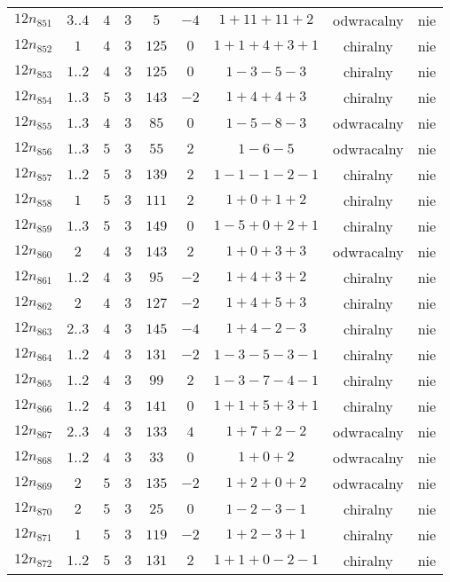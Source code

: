 \begin{longtable}{ccccccccc}
$12n_{851}$ & $3..4$ & $4$ & $3$ & $5$ & $-4$ & $1+11+11+2$ & odwracalny & nie \\
$12n_{852}$ & $1$ & $4$ & $3$ & $125$ & $0$ & $1+1+4+3+1$ & chiralny & nie \\
$12n_{853}$ & $1..2$ & $4$ & $3$ & $125$ & $0$ & $1-3-5-3$ & chiralny & nie \\
$12n_{854}$ & $1..3$ & $5$ & $3$ & $143$ & $-2$ & $1+4+4+3$ & chiralny & nie \\
$12n_{855}$ & $1..3$ & $4$ & $3$ & $85$ & $0$ & $1-5-8-3$ & odwracalny & nie \\
$12n_{856}$ & $1..3$ & $5$ & $3$ & $55$ & $2$ & $1-6-5$ & odwracalny & nie \\
$12n_{857}$ & $1..2$ & $5$ & $3$ & $139$ & $2$ & $1-1-1-2-1$ & chiralny & nie \\
$12n_{858}$ & $1$ & $5$ & $3$ & $111$ & $2$ & $1+0+1+2$ & chiralny & nie \\
$12n_{859}$ & $1..3$ & $5$ & $3$ & $149$ & $0$ & $1-5+0+2+1$ & chiralny & nie \\
$12n_{860}$ & $2$ & $4$ & $3$ & $143$ & $2$ & $1+0+3+3$ & odwracalny & nie \\
$12n_{861}$ & $1..2$ & $4$ & $3$ & $95$ & $-2$ & $1+4+3+2$ & chiralny & nie \\
$12n_{862}$ & $2$ & $4$ & $3$ & $127$ & $-2$ & $1+4+5+3$ & chiralny & nie \\
$12n_{863}$ & $2..3$ & $4$ & $3$ & $145$ & $-4$ & $1+4-2-3$ & chiralny & nie \\
$12n_{864}$ & $1..2$ & $4$ & $3$ & $131$ & $-2$ & $1-3-5-3-1$ & chiralny & nie \\
$12n_{865}$ & $1..2$ & $4$ & $3$ & $99$ & $2$ & $1-3-7-4-1$ & chiralny & nie \\
$12n_{866}$ & $1..2$ & $4$ & $3$ & $141$ & $0$ & $1+1+5+3+1$ & chiralny & nie \\
$12n_{867}$ & $2..3$ & $4$ & $3$ & $133$ & $4$ & $1+7+2-2$ & odwracalny & nie \\
$12n_{868}$ & $1..2$ & $4$ & $3$ & $33$ & $0$ & $1+0+2$ & odwracalny & nie \\
$12n_{869}$ & $2$ & $5$ & $3$ & $135$ & $-2$ & $1+2+0+2$ & odwracalny & nie \\
$12n_{870}$ & $2$ & $5$ & $3$ & $25$ & $0$ & $1-2-3-1$ & chiralny & nie \\
$12n_{871}$ & $1$ & $5$ & $3$ & $119$ & $-2$ & $1+2-3+1$ & chiralny & nie \\
$12n_{872}$ & $1..2$ & $5$ & $3$ & $131$ & $2$ & $1+1+0-2-1$ & chiralny & nie \\

\end{longtable}

